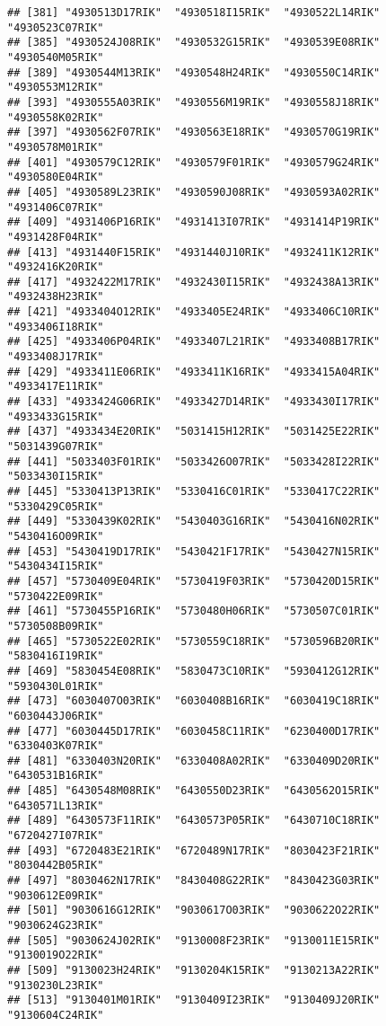 \documentclass[
]{article}
\begin{document}
\begin{verbatim}
## [381] "4930513D17RIK"  "4930518I15RIK"  "4930522L14RIK"  "4930523C07RIK" 
## [385] "4930524J08RIK"  "4930532G15RIK"  "4930539E08RIK"  "4930540M05RIK" 
## [389] "4930544M13RIK"  "4930548H24RIK"  "4930550C14RIK"  "4930553M12RIK" 
## [393] "4930555A03RIK"  "4930556M19RIK"  "4930558J18RIK"  "4930558K02RIK" 
## [397] "4930562F07RIK"  "4930563E18RIK"  "4930570G19RIK"  "4930578M01RIK" 
## [401] "4930579C12RIK"  "4930579F01RIK"  "4930579G24RIK"  "4930580E04RIK" 
## [405] "4930589L23RIK"  "4930590J08RIK"  "4930593A02RIK"  "4931406C07RIK" 
## [409] "4931406P16RIK"  "4931413I07RIK"  "4931414P19RIK"  "4931428F04RIK" 
## [413] "4931440F15RIK"  "4931440J10RIK"  "4932411K12RIK"  "4932416K20RIK" 
## [417] "4932422M17RIK"  "4932430I15RIK"  "4932438A13RIK"  "4932438H23RIK" 
## [421] "4933404O12RIK"  "4933405E24RIK"  "4933406C10RIK"  "4933406I18RIK" 
## [425] "4933406P04RIK"  "4933407L21RIK"  "4933408B17RIK"  "4933408J17RIK" 
## [429] "4933411E06RIK"  "4933411K16RIK"  "4933415A04RIK"  "4933417E11RIK" 
## [433] "4933424G06RIK"  "4933427D14RIK"  "4933430I17RIK"  "4933433G15RIK" 
## [437] "4933434E20RIK"  "5031415H12RIK"  "5031425E22RIK"  "5031439G07RIK" 
## [441] "5033403F01RIK"  "5033426O07RIK"  "5033428I22RIK"  "5033430I15RIK" 
## [445] "5330413P13RIK"  "5330416C01RIK"  "5330417C22RIK"  "5330429C05RIK" 
## [449] "5330439K02RIK"  "5430403G16RIK"  "5430416N02RIK"  "5430416O09RIK" 
## [453] "5430419D17RIK"  "5430421F17RIK"  "5430427N15RIK"  "5430434I15RIK" 
## [457] "5730409E04RIK"  "5730419F03RIK"  "5730420D15RIK"  "5730422E09RIK" 
## [461] "5730455P16RIK"  "5730480H06RIK"  "5730507C01RIK"  "5730508B09RIK" 
## [465] "5730522E02RIK"  "5730559C18RIK"  "5730596B20RIK"  "5830416I19RIK" 
## [469] "5830454E08RIK"  "5830473C10RIK"  "5930412G12RIK"  "5930430L01RIK" 
## [473] "6030407O03RIK"  "6030408B16RIK"  "6030419C18RIK"  "6030443J06RIK" 
## [477] "6030445D17RIK"  "6030458C11RIK"  "6230400D17RIK"  "6330403K07RIK" 
## [481] "6330403N20RIK"  "6330408A02RIK"  "6330409D20RIK"  "6430531B16RIK" 
## [485] "6430548M08RIK"  "6430550D23RIK"  "6430562O15RIK"  "6430571L13RIK" 
## [489] "6430573F11RIK"  "6430573P05RIK"  "6430710C18RIK"  "6720427I07RIK" 
## [493] "6720483E21RIK"  "6720489N17RIK"  "8030423F21RIK"  "8030442B05RIK" 
## [497] "8030462N17RIK"  "8430408G22RIK"  "8430423G03RIK"  "9030612E09RIK" 
## [501] "9030616G12RIK"  "9030617O03RIK"  "9030622O22RIK"  "9030624G23RIK" 
## [505] "9030624J02RIK"  "9130008F23RIK"  "9130011E15RIK"  "9130019O22RIK" 
## [509] "9130023H24RIK"  "9130204K15RIK"  "9130213A22RIK"  "9130230L23RIK" 
## [513] "9130401M01RIK"  "9130409I23RIK"  "9130409J20RIK"  "9130604C24RIK" 

\end{verbatim}
\end{document}

